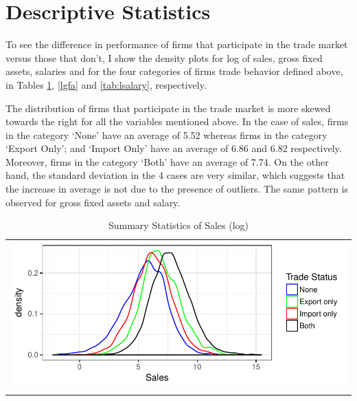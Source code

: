 \documentclass[12pt]{article}
\begin{document}
\begin{center}

\end{center}

\section{Descriptive Statistics}\label{sec:desc}
To see the difference in performance of firms that participate in the trade market
versus those that don't, I show the density plots for log of sales, gross fixed assets,
salaries and for the four categories of 
firms trade behavior defined above, in  
Tables \ref{lsales}, \ref{lgfa} and \ref{tab:lsalary}, respectively. 

The distribution of firms that participate in the trade market is more skewed towards the right for all the
variables mentioned above. In the case of sales, firms in the category
`None' have an average of 5.52 whereas firms in the category `Export Only';
and `Import Only' have an average  of 6.86 and
6.82 respectively. Moreover, firms in the category `Both' have an average
of  7.74.  On the other hand, the standard deviation in the 4 
cases are very similar, which suggests that the increase in average is
not due to the presence of outliers. The same pattern is observed for
gross fixed assets and salary.  

\begin{center}
\begin{table}[H]
\caption{Summary Statistics of Sales (log)}
\label{lsales}
\begin{tabular}{c}
 \includegraphics{./PICS/denslsales.pdf}   \\ 
   \\  
\end{tabular}
\end{table}
\end{center}

\end{document}
